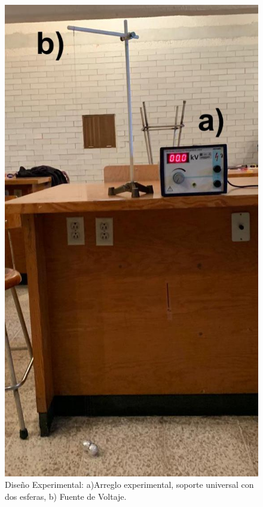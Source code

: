 \documentclass[letterpaper, 11 pt]{article}
\begin{document}
\begin{multicols*}{2}
 \begin{figure}[H]
    \captionsetup{justification=centering,margin=0cm}
    \includegraphics[scale=0.23]{pitillino.jpeg}
    \centering
    \caption{Diseño Experimental: a)Arreglo experimental, soporte universal con dos esferas, b) Fuente de Voltaje.}
\end{figure}




\end{multicols*}
\end{document}
